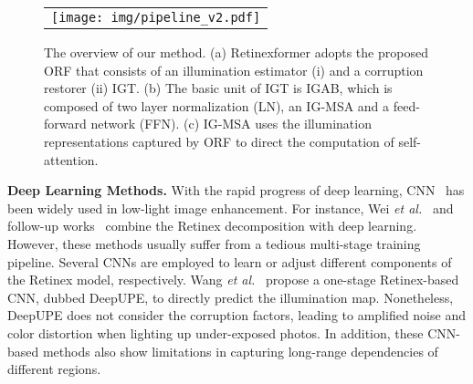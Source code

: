 \documentclass[10pt,twocolumn,letterpaper]{article}
\begin{document}
\begin{figure*}[htp]
	\begin{center}
		\begin{tabular}[t]{c} \hspace{-3.3mm}
			\texttt{[image: img/pipeline\_v2.pdf]}
		\end{tabular}
	\end{center}
	\vspace*{-1mm}
	\caption{\small The overview of our method. (a) Retinexformer adopts the proposed ORF that consists of an illumination estimator (i) and a corruption restorer (ii)  IGT. (b) The basic unit of IGT is IGAB, which is composed of two layer normalization (LN), an IG-MSA and a feed-forward network (FFN). (c) IG-MSA uses the illumination representations captured by ORF  to direct the computation of self-attention.}
	\label{fig:pipeline}
	\vspace{-2mm}
\end{figure*}

\vspace{0.5mm}
\noindent\textbf{Deep Learning Methods.} With the rapid progress of deep learning, CNN~\cite{le-gan,zero_reference,enlightengan,llnet,mbllen,deep_lpf,sharma2021nighttime,deep_upe,mirnet,kind,lednet} has been widely used in low-light image enhancement. For instance, Wei \emph{et al.}~\cite{retinex_net} and follow-up works~\cite{kind_plus,kind} combine the Retinex decomposition with deep learning. However, these methods usually suffer from a tedious multi-stage training pipeline. Several CNNs are employed to learn or adjust different components of the Retinex model, respectively. Wang \emph{et al.}~\cite{deep_upe} propose a one-stage Retinex-based  CNN, dubbed DeepUPE, to directly predict the illumination map. Nonetheless, DeepUPE does not consider the corruption factors, leading to amplified noise and color distortion when lighting up  under-exposed photos. In addition, these CNN-based methods also show limitations in capturing long-range dependencies of different  regions.

\vspace{-0.5mm}
\end{document}
